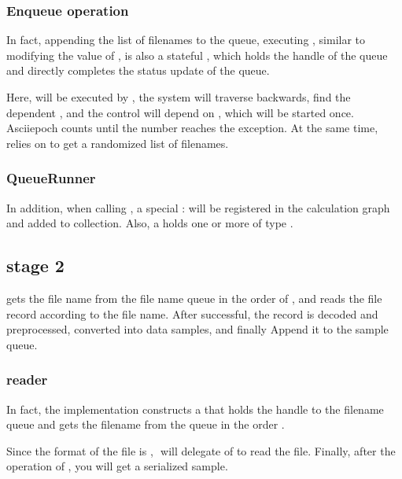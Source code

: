 \begin{content}
\subsubsection{Enqueue operation}

In fact, appending the list of filenames to the queue, executing , similar to  modifying the value of ,  is also a stateful , which holds the handle of the queue and directly completes the status update of the queue.

Here,  will be executed by , the system will traverse backwards, find the dependent , and the control will depend on , which will be started once. Ascii{epoch} counts until the  number reaches the  exception. At the same time,  relies on  to get a randomized list of filenames.

\subsubsection{QueueRunner}

In addition, when calling , a special : will be registered in the calculation graph and added to  collection. Also, a  holds one or more  of type .

\subsection{stage 2}

 gets the file name from the file name queue in the order of , and reads the file record according to the file name. After successful, the record is decoded and preprocessed, converted into data samples, and finally Append it to the sample queue.

\subsubsection{reader}

In fact, the implementation constructs a  that holds the handle to the filename queue and gets the filename from the queue in the order .

Since the format of the file is , ​​ will delegate  of  to read the file. Finally, after the operation of , you will get a serialized sample.


\end{content}
